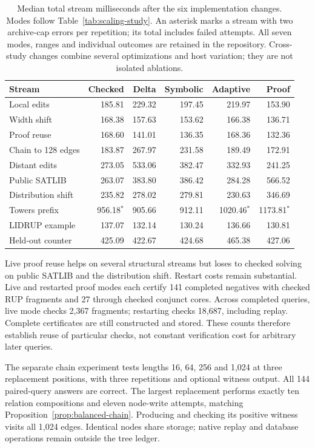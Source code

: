 \documentclass[11pt,a4paper]{article}
\numberwithin{equation}{section}
\theoremstyle{plain}
\theoremstyle{definition}
\theoremstyle{remark}
\begin{document}
\begin{table}[tb]
\centering
\small
\setlength{\tabcolsep}{4pt}
\begin{tabular}{lrrrrr}
\toprule
Stream & Checked & Delta & Symbolic & Adaptive & Proof \\
\midrule
Local edits & 185.81 & 229.32 & 197.45 & 219.97 & 153.90 \\
Width shift & 168.38 & 157.63 & 153.62 & 166.38 & 136.71 \\
Proof reuse & 168.60 & 141.01 & 136.35 & 168.36 & 132.36 \\
Chain to 128 edges & 183.87 & 267.97 & 231.58 & 189.49 & 172.91 \\
Distant edits & 273.05 & 533.06 & 382.47 & 332.93 & 241.25 \\
Public SATLIB & 263.07 & 383.80 & 386.42 & 284.28 & 566.52 \\
Distribution shift & 235.82 & 278.02 & 279.81 & 230.63 & 346.69 \\
Towers prefix & 956.18$^*$ & 905.66 & 912.11 & 1020.46$^*$ & 1173.81$^*$ \\
LIDRUP example & 137.07 & 132.14 & 130.24 & 136.66 & 130.81 \\
Held-out counter & 425.09 & 422.67 & 424.68 & 465.38 & 427.06 \\
\bottomrule
\end{tabular}
\caption{Median total stream milliseconds after the six implementation changes. Modes follow Table~\ref{tab:scaling-study}. An asterisk marks a stream with two archive-cap errors per repetition; its total includes failed attempts. All seven modes, ranges and individual outcomes are retained in the repository. Cross-study changes combine several optimizations and host variation; they are not isolated ablations.}
\label{tab:followup-study}
\end{table}

Live proof reuse helps on several structural streams but loses to checked solving on public SATLIB and the distribution shift. Restart costs remain substantial. Live and restarted proof modes each certify 141 completed negatives with checked RUP fragments and 27 through checked conjunct cores. Across completed queries, live mode checks 2,367 fragments; restarting checks 18,687, including replay. Complete certificates are still constructed and stored. These counts therefore establish reuse of particular checks, not constant verification cost for arbitrary later queries.

The separate chain experiment tests lengths 16, 64, 256 and 1,024 at three replacement positions, with three repetitions and optional witness output. All 144 paired-query answers are correct. The largest replacement performs exactly ten relation compositions and eleven node-write attempts, matching Proposition~\ref{prop:balanced-chain}. Producing and checking its positive witness visits all 1,024 edges. Identical nodes share storage; native replay and database operations remain outside the tree ledger.
\end{document}
